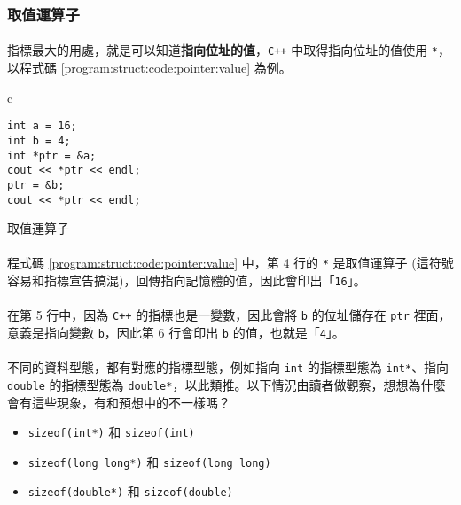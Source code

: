 \documentclass[12pt,a4paper,oneside]{report}
\begin{document}
\begin{CJK}{UTF8}{bkai}
\subsubsection{取值運算子}

\paragraph{}指標最大的用處，就是可以知道{\color{red}\textbf{指向位址的值}}，\texttt{C++} 中取得指向位址的值使用 \lstinline!*!，以程式碼 \ref{program:struct:code:pointer:value} 為例。

\begin{code}[h!]
\centering
\begin{tabular}{c}
\begin{lstlisting}
int a = 16;
int b = 4;
int *ptr = &a;
cout << *ptr << endl;
ptr = &b;
cout << *ptr << endl;
\end{lstlisting}
\end{tabular}
\caption{取值運算子}
\label{program:struct:code:pointer:value}
\end{code}

\paragraph{}程式碼 \ref{program:struct:code:pointer:value} 中，第 4 行的 \lstinline!*! 是取值運算子 (這符號容易和指標宣告搞混)，回傳指向記憶體的值，因此會印出「\lstinline!16!」。
\paragraph{}在第 5 行中，因為 \texttt{C++} 的指標也是一變數，因此會將 \lstinline!b! 的位址儲存在 \lstinline!ptr! 裡面，意義是指向變數 \lstinline!b!，因此第 6 行會印出 \lstinline!b! 的值，也就是「\lstinline!4!」。

\paragraph{}不同的資料型態，都有對應的指標型態，例如指向 \lstinline!int! 的指標型態為 \lstinline!int*!、指向 \lstinline!double! 的指標型態為 \lstinline!double*!，以此類推。以下情況由讀者做觀察，想想為什麼會有這些現象，有和預想中的不一樣嗎？
\begin{itemize}
\item \lstinline!sizeof(int*)! 和 \lstinline!sizeof(int)!
\item \lstinline!sizeof(long long*)! 和 \lstinline!sizeof(long long)!
\item \lstinline!sizeof(double*)! 和 \lstinline!sizeof(double)!
\end{itemize}


\end{CJK}
\end{document}
